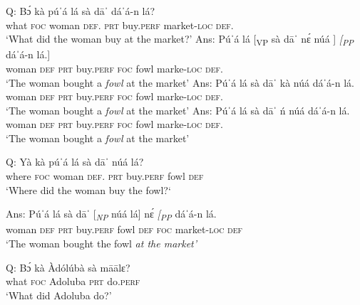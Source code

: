 \documentclass[output=paper
,newtxmath
,modfonts
,nonflat]{langsci/langscibook}
\begin{document}
 
\ea\label{ex:abubakari:8}
\ea \label{ex:abubakari:8a} 
Q: \gll Bɔ́  kà  púˈá    lá  sà  dāˈ  dáˈá-n  lá?\\   
      what  \textsc{foc}   woman  \textsc{def}.  \textsc{prt}  buy.\textsc{perf}     market-\textsc{loc}  \textsc{def}. \\
 \glt   ‘What did the woman buy at the market?’
\ex \label{ex:abubakari:8b} 
Ans: \gll  Púˈá  lá   [\textsubscript{VP} sà  dāˈ    nɛ́  núá ]  \textit{[\textsubscript{PP}} dáˈá-n    lá.]\\ 
             woman  \textsc{def} {}  \textsc{prt}  buy.\textsc{perf}  \textsc{foc}  fowl  {} {}  marke-\textsc{loc}  \textsc{def}.\\
 \glt ‘The woman bought a \textit{fowl} at the market’
 \ex \label{ex:abubakari:8c} 
Ans:  \gll *Púˈá  lá  sà  dāˈ    kà  núá  dáˈá-n    lá. \\
woman  \textsc{def}  \textsc{prt}  buy.\textsc{perf}  \textsc{foc}  fowl   marke-\textsc{loc}  \textsc{def}. \\
\glt     ‘The woman bought a \textit{fowl} at the market’
 \ex \label{ex:abubakari:8d} 
Ans:  \gll *Púˈá    lá     sà  dāˈ    ń  núá dáˈá-n  lá.\\
woman  \textsc{def}  \textsc{prt}  buy.\textsc{perf}  \textsc{foc}  fowl marke-\textsc{loc}   \textsc{def}. \\
\glt ‘The woman bought a \textit{fowl} at the market’
\z
\z
 
\ea\label{ex:abubakari:9}
\ea \label{ex:abubakari:9a} 
Q: \gll Yà  kà   púˈá    lá  sà  dāˈ                                                     núá  lá?\\
where  \textsc{foc}  woman  \textsc{def}.  \textsc{prt}  buy.\textsc{perf} fowl  \textsc{def}\\
\glt ‘Where did the woman buy the fowl?‘
 
\ex\label{ex:abubakari:9b}
Ans: \gll Púˈá  lá  sà  dāˈ  [\textit{\textsubscript{NP} } núá  lá]  nɛ́  \textit{[\textsubscript{PP} } dáˈá-n          lá.\\
woman  \textsc{def}   \textsc{prt}  buy.\textsc{perf} {} fowl  \textsc{def}  \textsc{foc} {} market-\textsc{loc}   \textsc{def}\\
 \glt    ‘The woman bought the fowl \textit{at the market’}

\z
\z 
 
\ea\label{ex:abubakari:10}
\ea\label{ex:abubakari:10a} 
Q: \gll Bɔ́  kà  Àdólúbà  sà  māālɛ?         \\
what  \textsc{foc}  Adoluba  \textsc{prt}  do.\textsc{perf}\\              
\glt ‘What did Adoluba do?’        
\end{document}
